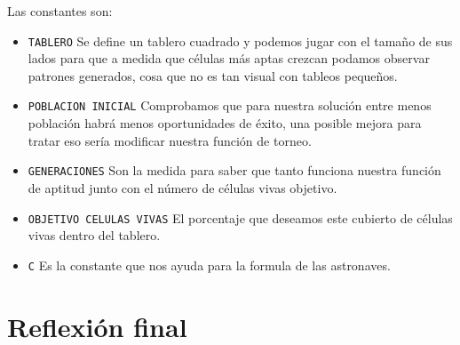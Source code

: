 Las constantes son:
\begin{itemize}
    \item \texttt{TABLERO} Se define un tablero cuadrado y podemos jugar con el tamaño
    de sus lados para que a medida que células más aptas crezcan podamos observar patrones
    generados, cosa que no es tan visual con tableos pequeños.

    \item \texttt{POBLACION INICIAL} Comprobamos que para nuestra solución entre menos 
    población habrá menos oportunidades de éxito, una posible mejora para tratar eso sería 
    modificar nuestra función de torneo. 

    \item \texttt{GENERACIONES} Son la medida para saber que tanto funciona nuestra función 
    de aptitud junto con el número de células vivas objetivo. 

    \item \texttt{OBJETIVO CELULAS VIVAS} El porcentaje que deseamos este cubierto de células 
    vivas dentro del tablero.

    \item \texttt{C} Es la constante que nos ayuda para la formula de las astronaves.   
\end{itemize}

\section{Reflexión final}


